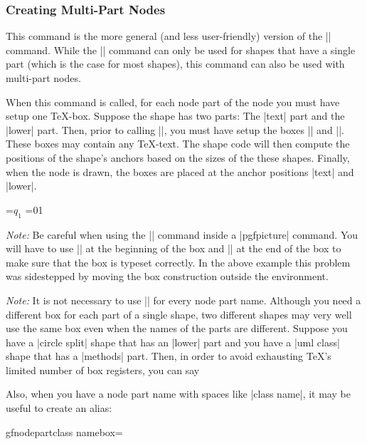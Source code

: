 \subsubsection{Creating Multi-Part Nodes}

\begin{command}{\pgfmultipartnode{}}
  This command is the more general (and less user-friendly) version of
  the |\pgfnode| command. While the |\pgfnode| command can only be
  used for shapes that have a single part (which is the case for most
  shapes), this command can also be used with multi-part nodes.

  When this command is called, for each node part of the node you must
  have setup one \TeX-box. Suppose the shape has two parts: The |text|
  part and the |lower| part. Then, prior to calling
  |\pgfmultipartnode|, you must have setup the boxes
  |\pgfnodeparttextbox| and |\pgfnodepartlowerbox|. These boxes may
  contain any \TeX-text. The shape code will then compute the
  positions of the shape's anchors based on the sizes of the these
  shapes. Finally, when the node is drawn, the boxes are placed at the
  anchor positions |text| and |lower|.

\begin{codeexample}[]
\setbox\pgfnodeparttextbox=\hbox{$q_1$}
\setbox\pgfnodepartlowerbox=\hbox{01}
\begin{pgfpicture}
\end{pgfpicture}
\end{codeexample}

  \emph{Note:\/} Be careful when using the |\setbox| command inside a
  |{pgfpicture}| command. You will have to use |\pgfinterruptpath| at
  the beginning of the box and |\endpgfinterruptpath| at the end of
  the box to make sure that the box is typeset correctly. In the above
  example this problem was sidestepped by moving the box construction
  outside the environment.

  \emph{Note:\/} It is not necessary to use |\newbox| for every node
  part name. Although you need a different box for each part of a
  single shape, two different shapes may very well use the same box
  even when the names of the parts are different. Suppose you have a
  |circle split| shape that has an |lower| part and you have a
  |uml class| shape that has a |methods| part. Then, in order to avoid
  exhausting \TeX's limited number of box registers, you can say
\begin{codeexample}
\newbox\pgfnodepartlowerbox
\let\pgfnodepartmethodsbox=\pgfnodepartlowerbox
\end{codeexample}
  Also, when you have a node part name with spaces like |class name|,
  it may be useful to create an alias:
\begin{codeexample}
\newbox\mybox
\expandafter\let\csname pgfnodepartclass namebox\endcsname=\mybox
\end{codeexample}
\end{command}

